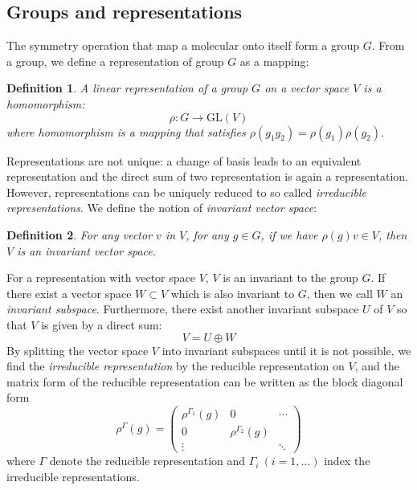 \documentclass{article}
\newtheorem{definition}{Definition}
\begin{document}
\subsection{Groups and representations}
The symmetry operation that map a molecular onto itself form a group $G$. From a group,
we define a representation of group $G$ as a mapping:
\begin{definition}
    A linear \emph{representation} of a group $G$ on a vector space $V$ is a homomorphism:
    \[\rho\colon G \to \text{GL}(V)\]
    where homomorphism is a mapping that satisfies $\rho(g_1g_2) = \rho(g_1)\rho(g_2)$.
\end{definition}
Representations are not unique: a change of basis leads to an equivalent representation 
and the direct sum of two representation is again a representation. However, representations
can be uniquely reduced to so called \emph{irreducible representations}.
We define the notion of \emph{invariant vector space}:
\begin{definition}
    For any vector $v$ in $V$, for any $g\in G$, if we have $\rho(g)v \in V$, then $V$
    is an invariant vector space.
\end{definition} 
For a representation with vector space $V$, $V$ is an invariant to the group $G$. 
If there exist a vector space $W\subset V$ which is also invariant to $G$, then we call $W$
an \emph{invariant subspace}. 
Furthermore, there exist another invariant subspace $U$ of $V$ so that $V$ is given by a direct sum:
\begin{equation}
    V = U \oplus W
\end{equation}
By splitting the vector space $V$ into invariant subspaces until it is not possible, we find the 
\emph{irreducible representation} by the reducible representation on $V$, and the matrix form 
of the reducible representation can be written as the block diagonal form
\begin{equation}
    \rho^{\Gamma}(g) = \left(  
        \begin{matrix}
            \rho^{\Gamma_1} (g) & 0 & \cdots\\
            0 & \rho^{\Gamma_2} (g) & \\
            \vdots &  & \ddots
        \end{matrix}
    \right)
\end{equation}
where $\Gamma$ denote the reducible representation and $\Gamma_i\ (i = 1, \dots)$ index 
the irreducible representations.
\end{document}
